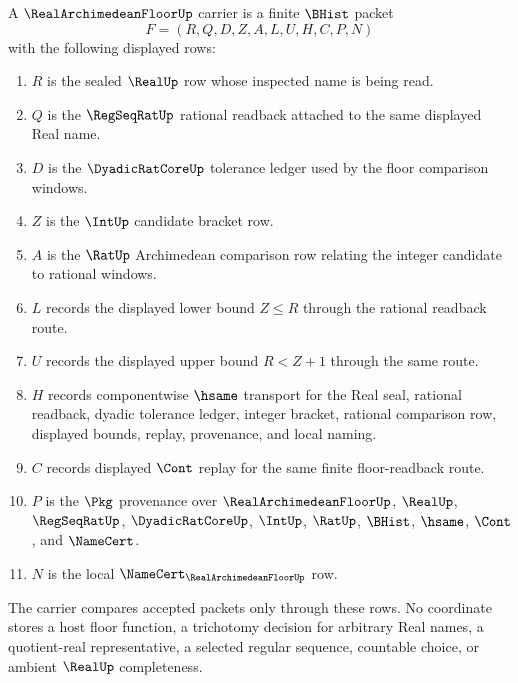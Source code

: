\begin{definition}
\label{def:real-archimedean-floor-carrier}
A $\RealArchimedeanFloorUp$ carrier is a finite $\BHist$ packet
$$
F=(R,Q,D,Z,A,L,U,H,C,P,N)
$$
with the following displayed rows:
\begin{enumerate}
\item $R$ is the sealed $\RealUp$ row whose inspected name is being read.
\item $Q$ is the $\RegSeqRatUp$ rational readback attached to the same displayed Real name.
\item $D$ is the $\DyadicRatCoreUp$ tolerance ledger used by the floor comparison windows.
\item $Z$ is the $\IntUp$ candidate bracket row.
\item $A$ is the $\RatUp$ Archimedean comparison row relating the integer candidate to rational windows.
\item $L$ records the displayed lower bound $Z \leq R$ through the rational readback route.
\item $U$ records the displayed upper bound $R < Z+1$ through the same route.
\item $H$ records componentwise $\hsame$ transport for the Real seal, rational readback, dyadic tolerance ledger, integer bracket, rational comparison row, displayed bounds, replay, provenance, and local naming.
\item $C$ records displayed $\Cont$ replay for the same finite floor-readback route.
\item $P$ is the $\Pkg$ provenance over $\RealArchimedeanFloorUp$, $\RealUp$, $\RegSeqRatUp$, $\DyadicRatCoreUp$, $\IntUp$, $\RatUp$, $\BHist$, $\hsame$, $\Cont$, and $\NameCert$.
\item $N$ is the local $\NameCert_{\RealArchimedeanFloorUp}$ row.
\end{enumerate}
The carrier compares accepted packets only through these rows. No coordinate stores a host floor function, a trichotomy decision for arbitrary Real names, a quotient-real representative, a selected regular sequence, countable choice, or ambient $\RealUp$ completeness.
\end{definition}

